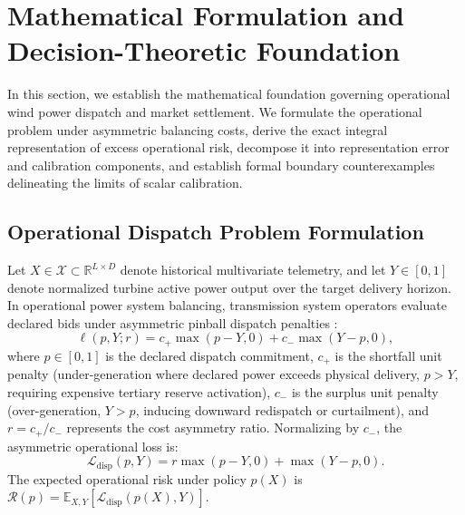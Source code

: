 \section{Mathematical Formulation and Decision-Theoretic Foundation}
\label{sec:theory}

In this section, we establish the mathematical foundation governing operational wind power dispatch and market settlement. We formulate the operational problem under asymmetric balancing costs, derive the exact integral representation of excess operational risk, decompose it into representation error and calibration components, and establish formal boundary counterexamples delineating the limits of scalar calibration.

\subsection{Operational Dispatch Problem Formulation}
Let $X \in \mathcal{X} \subset \mathbb{R}^{L \times D}$ denote historical multivariate telemetry, and let $Y \in [0, 1]$ denote normalized turbine active power output over the target delivery horizon. In operational power system balancing, transmission system operators evaluate declared bids under asymmetric pinball dispatch penalties \cite{weron2014,zhang2014wind}:
\begin{equation}
\ell(p, Y; r) = c_+ \max(p - Y, 0) + c_- \max(Y - p, 0),
\label{eq:pinball_loss}
\end{equation}
where $p \in [0, 1]$ is the declared dispatch commitment, $c_+$ is the shortfall unit penalty (under-generation where declared power exceeds physical delivery, $p > Y$, requiring expensive tertiary reserve activation), $c_-$ is the surplus unit penalty (over-generation, $Y > p$, inducing downward redispatch or curtailment), and $r = c_+ / c_-$ represents the cost asymmetry ratio. Normalizing by $c_-$, the asymmetric operational loss is:
\begin{equation}
\mathcal{L}_{\text{disp}}(p, Y) = r \max(p - Y, 0) + \max(Y - p, 0).
\label{eq:norm_disp_loss}
\end{equation}
The expected operational risk under policy $p(X)$ is $\mathcal{R}(p) = \mathbb{E}_{X, Y} [\mathcal{L}_{\text{disp}}(p(X), Y)]$.

